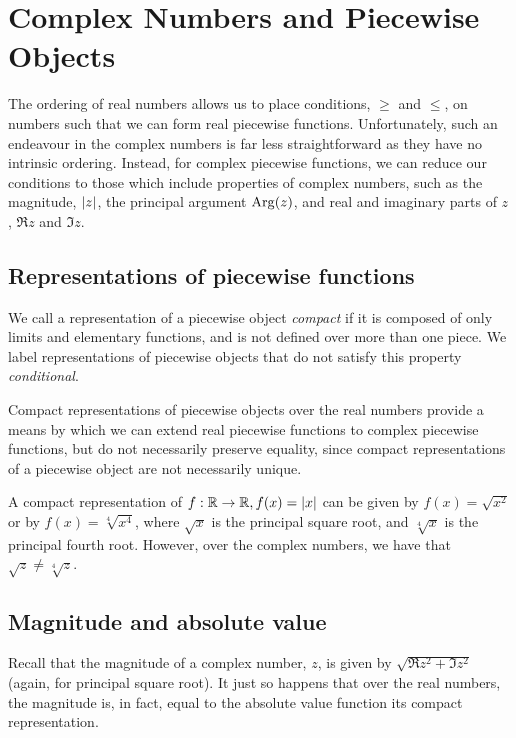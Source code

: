 \chapter{Complex Numbers and Piecewise Objects}
The ordering of real numbers allows us to place conditions, $\geq$ and $\leq$, on numbers such that we can form real piecewise functions. Unfortunately, such an endeavour in the complex numbers is far less straightforward as they have no intrinsic ordering. Instead, for complex piecewise functions, we can reduce our conditions to those which include properties of complex numbers, such as the magnitude, $\abs{z}$, the principal argument $\Arg{z}$, and real and imaginary parts of $z$, $\Re{z}$ and $\Im{z}$.

\section{Representations of piecewise functions}
We call a representation of a piecewise object \textit{compact} if it is composed of only limits and elementary functions, and is not defined over more than one piece. We label representations of piecewise objects that do not satisfy this property \textit{conditional}.

Compact representations of piecewise objects over the real numbers provide a means by which we can extend real piecewise functions to complex piecewise functions, but do not necessarily preserve equality, since compact representations of a piecewise object are not necessarily unique.

\begin{example}
    A compact representation of $f:\mathbb{R}\to\mathbb{R}, f(x)=\abs{x}$ can be given by $f(x)=\sqrt{x^2}$ or by $f(x)=\sqrt[4]{x^4}$, where $\sqrt{x}$ is the principal square root, and $\sqrt[4]{x}$ is the principal fourth root. However, over the complex numbers, we have that $\sqrt{z}\neq\sqrt[4]{z}$.
\end{example}

\section{Magnitude and absolute value}
Recall that the magnitude of a complex number, $z$, is given by $\sqrt{\Re{z}^2+\Im{z}^2}$ (again, for principal square root). It just so happens that over the real numbers, the magnitude is, in fact, equal to the absolute value function its compact representation.

